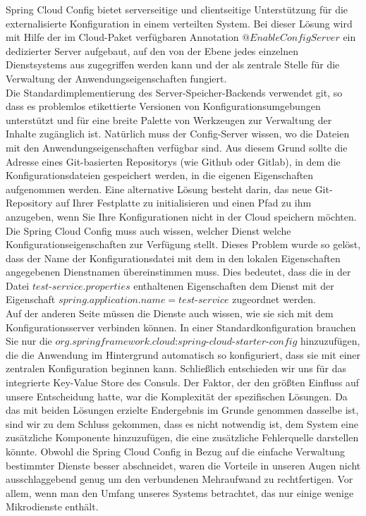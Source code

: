 Spring Cloud Config bietet serverseitige und clientseitige Unterstützung für die externalisierte Konfiguration in einem verteilten System. Bei dieser Lösung wird mit Hilfe der im Cloud-Paket verfügbaren Annotation $@EnableConfigServer$ ein dedizierter Server aufgebaut, auf den von der Ebene jedes einzelnen Dienstsystems aus zugegriffen werden kann und der als zentrale Stelle für die Verwaltung der Anwendungseigenschaften fungiert.\\ Die Standardimplementierung des Server-Speicher-Backends verwendet git, so dass es problemlos etikettierte Versionen von Konfigurationsumgebungen unterstützt und für eine breite Palette von Werkzeugen zur Verwaltung der Inhalte zugänglich ist. Natürlich muss der Config-Server wissen, wo die Dateien mit den Anwendungseigenschaften verfügbar sind. Aus diesem Grund sollte die Adresse eines Git-basierten Repositorys (wie Github oder Gitlab), in dem die Konfigurationsdateien gespeichert werden, in die eigenen Eigenschaften aufgenommen werden. Eine alternative Lösung besteht darin, das neue Git-Repository auf Ihrer Festplatte zu initialisieren und einen Pfad zu ihm anzugeben, wenn Sie Ihre Konfigurationen nicht in der Cloud speichern möchten. \\
Die Spring Cloud Config muss auch wissen, welcher Dienst welche Konfigurationseigenschaften zur Verfügung stellt. Dieses Problem wurde so gelöst, dass der Name der Konfigurationsdatei mit dem in den lokalen Eigenschaften angegebenen Dienstnamen übereinstimmen muss. Dies bedeutet, dass die in der Datei $test$-$service.properties$ enthaltenen Eigenschaften dem Dienst mit der Eigenschaft $spring.application.name=test$-$service$ zugeordnet werden. \\
Auf der anderen Seite müssen die Dienste auch wissen, wie sie sich mit dem Konfigurationsserver verbinden können. In einer Standardkonfiguration brauchen Sie nur die $org.springframework.cloud$:$spring$-$cloud$-$starter$-$config$ hinzuzufügen, die die Anwendung im Hintergrund automatisch so konfiguriert, dass sie mit einer zentralen Konfiguration beginnen kann.
Schließlich entschieden wir uns für das integrierte Key-Value Store des Consuls. Der Faktor, der den größten Einfluss auf unsere Entscheidung hatte, war die Komplexität der spezifischen Lösungen. Da das mit beiden Lösungen erzielte Endergebnis im Grunde genommen dasselbe ist, sind wir zu dem Schluss gekommen, dass es nicht notwendig ist, dem System eine zusätzliche Komponente hinzuzufügen, die eine zusätzliche Fehlerquelle darstellen könnte. Obwohl die Spring Cloud Config in Bezug auf die einfache Verwaltung bestimmter Dienste besser abschneidet, waren die Vorteile in unseren Augen nicht ausschlaggebend genug um den verbundenen Mehraufwand zu rechtfertigen. Vor allem, wenn man den Umfang unseres Systems betrachtet, das nur einige wenige Mikrodienste enthält. \\
